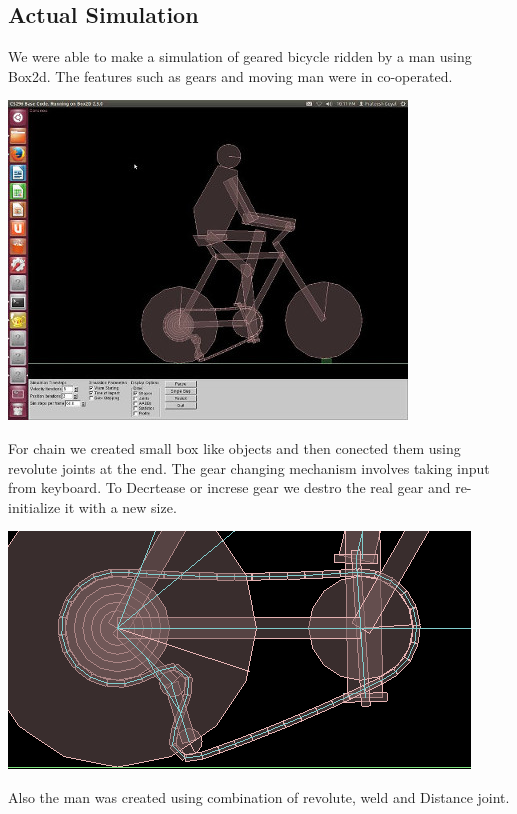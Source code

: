 \documentclass[11pt]{article}
\begin{document}
\subsection{Actual Simulation}
We were able to make a simulation of geared bicycle ridden by a man using Box2d. The features such as gears and moving man were in co-operated. \\
	\begin{center}
	\includegraphics[scale=0.6]{pic3}
	\end{center}
For chain we created small box like objects and then conected them using revolute joints at the end. The gear changing mechanism involves taking input from keyboard. To Decrtease or increse gear we destro the real gear and re-initialize it with a new size. \\
\begin{center}
	\includegraphics[scale=0.4]{pic4}
	\end{center}
	 Also the man was created using combination of revolute, weld and Distance joint.\\
\end{document}
